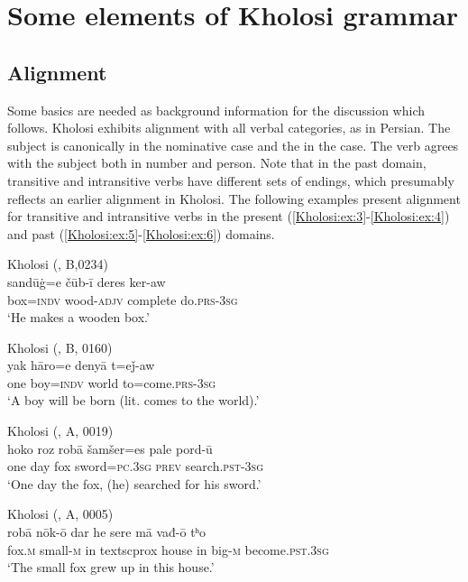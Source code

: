 \documentclass[output=paper,colorlinks,citecolor=brown]{langscibook}
\begin{document}
\section{Some elements of Kholosi grammar}\label{Kholosi:ss:2}

\subsection{Alignment}\label{Kholosi:ss:2.1}

Some basics are needed as background information for the discussion which follows. Kholosi exhibits  alignment with all verbal categories, as in Persian. The subject is canonically in the nominative case and the  in the  case. The verb agrees with the subject both in number and person. Note that in the past domain, transitive and intransitive verbs have different sets of endings, which presumably reflects an earlier  alignment in Kholosi. The following examples present  alignment for transitive and intransitive verbs in the present (\ref{Kholosi:ex:3}-\ref{Kholosi:ex:4}) and past (\ref{Kholosi:ex:5}-\ref{Kholosi:ex:6}) domains.

\ea\label{Kholosi:ex:3}
Kholosi (\citealt{nourzaei_kholosi_2022}, B,0234)\\
\gll sandūġ=e čūb-ī deres ker-aw \\
box\textsc{=indv} wood\textsc{-adjv} complete do\textsc{.prs-3sg} \\
\glt `He makes a wooden box.'
\z

\ea\label{Kholosi:ex:4}
Kholosi (\citealt{nourzaei_kholosi_2022}, B, 0160)\\
\gll yak hāro=e denyā t=eǰ-aw \\
one boy\textsc{=indv} world to=come\textsc{.prs-3sg} \\
\glt `A boy will be born (lit. comes to the world).'
\z


\newpage
\ea\label{Kholosi:ex:5}
Kholosi (\citealt{nourzaei_kholosi_2022}, A, 0019)\\
\gll hoko roz robā šamšer=es pale pord-ū \\
one day fox sword\textsc{=pc.3sg} \textsc{prev} search\textsc{.pst-3sg} \\
\glt `One day the fox, (he) searched for his sword.' 
\z

\ea\label{Kholosi:ex:6}
Kholosi (\citealt{nourzaei_kholosi_2022}, A, 0005)\\
\gll robā nōk-ō dar he sere mā vađ-ō tʰo \\
fox\textsc{.m} small\textsc{-m} in textsc{prox} house in big\textsc{-m} become\textsc{.pst.3sg} \\
\glt `The small fox grew up in this house.'
\z
\end{document}
